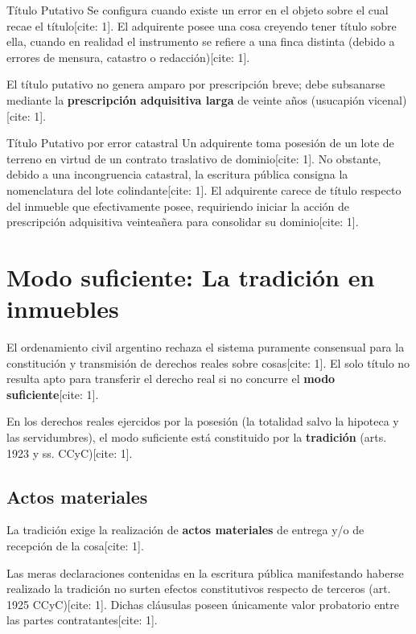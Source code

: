 \documentclass[12pt,oneside]{book}
\begin{document}
\begin{definition}{Título Putativo}
Se configura cuando existe un error en el objeto sobre el cual recae el título[cite: 1]. El adquirente posee una cosa creyendo tener título sobre ella, cuando en realidad el instrumento se refiere a una finca distinta (debido a errores de mensura, catastro o redacción)[cite: 1].
\end{definition}

El título putativo no genera amparo por prescripción breve; debe subsanarse mediante la \textbf{prescripción adquisitiva larga} de veinte años (usucapión vicenal)[cite: 1].

\begin{example}{Título Putativo por error catastral}
Un adquirente toma posesión de un lote de terreno en virtud de un contrato traslativo de dominio[cite: 1]. No obstante, debido a una incongruencia catastral, la escritura pública consigna la nomenclatura del lote colindante[cite: 1]. El adquirente carece de título respecto del inmueble que efectivamente posee, requiriendo iniciar la acción de prescripción adquisitiva veinteañera para consolidar su dominio[cite: 1].
\end{example}

\section{Modo suficiente: La tradición en inmuebles}

El ordenamiento civil argentino rechaza el sistema puramente consensual para la constitución y transmisión de derechos reales sobre cosas[cite: 1]. El solo título no resulta apto para transferir el derecho real si no concurre el \textbf{modo suficiente}[cite: 1].

En los derechos reales ejercidos por la posesión (la totalidad salvo la hipoteca y las servidumbres), el modo suficiente está constituido por la \textbf{tradición} (arts. 1923 y ss. CCyC)[cite: 1].

\subsection{Actos materiales}

La tradición exige la realización de \textbf{actos materiales} de entrega y/o de recepción de la cosa[cite: 1].

\begin{important}
Las meras declaraciones contenidas en la escritura pública manifestando haberse realizado la tradición no surten efectos constitutivos respecto de terceros (art. 1925 CCyC)[cite: 1]. Dichas cláusulas poseen únicamente valor probatorio entre las partes contratantes[cite: 1].
\end{important}
\end{document}
